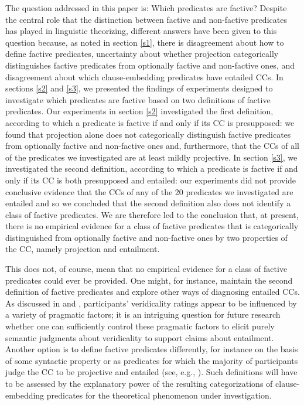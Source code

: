 \documentclass[11pt,fleqn]{article}
\newcommand{\6}{\mbox{$[\hspace*{-.6mm}[$}}
\newcommand{\9}{\mbox{$]\hspace*{-.6mm}]$}}
\begin{document}
{The question addressed in this paper is: Which predicates are factive? Despite the central role that the distinction between factive and non-factive predicates has played in linguistic theorizing, different answers have been given to this question because, as noted in section \ref{s1}, there is disagreement about how to define factive predicates, uncertainty about whether projection categorically distinguishes factive predicates from optionally factive and non-factive ones, and disagreement about which clause-embedding predicates have entailed CCs. In sections \ref{s2} and \ref{s3}, we presented the findings of experiments designed to investigate which predicates are factive based on  two definitions of factive predicates. Our experiments in section \ref{s2} investigated the first definition, according to which a predicate is factive if and only if its CC is presupposed: we found that projection alone does not categorically distinguish factive predicates from optionally factive and non-factive ones and, furthermore, that the CCs of all of the predicates we investigated are at least mildly projective. In section \ref{s3}, we investigated the second definition, according to which a predicate is factive if and only if its CC is both presupposed and entailed: our experiments did not provide conclusive evidence that the CCs of any of the 20 predicates we investigated are entailed and so we concluded that the second definition also does not identify a class of factive predicates. We are therefore led to the conclusion that, at present, there is no empirical evidence for a class of factive predicates that is categorically distinguished from optionally factive and non-factive ones by two properties of the CC, namely projection and entailment. 

This does not, of course, mean that no empirical evidence for a class of factive predicates could ever be provided. One might, for instance, maintain the second definition of factive predicates and explore other ways of diagnosing entailed CCs. As discussed in \citealt{demarneffe-etal2012} and \citealt{pavlick-kwiatkowski2019}, participants' veridicality ratings appear to be influenced by a variety of pragmatic factors; it is an intriguing question for future research whether one can sufficiently control these pragmatic factors to elicit purely semantic judgments about veridicality to support claims about entailment. Another option is to define factive predicates differently, for instance on the basis of some syntactic property or as predicates for which the majority of participants judge the CC to be projective and entailed (see, e.g., \citealt{white-rawlins-nels2018}). Such definitions will have to be assessed by the explanatory power of the resulting categorizations of clause-embedding predicates for the theoretical phenomenon under investigation. 

}
\end{document}

